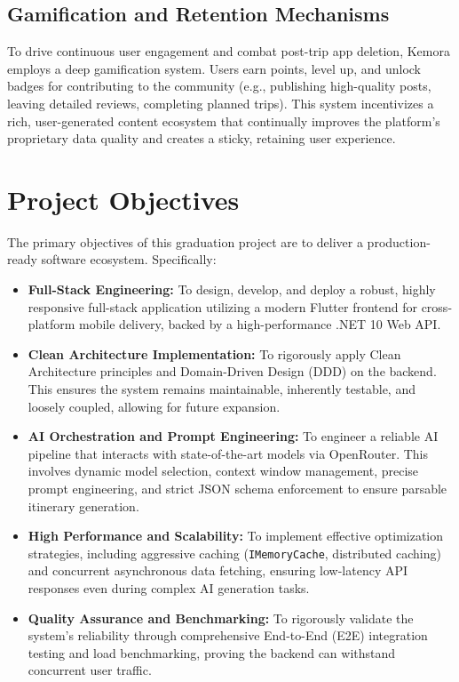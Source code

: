 \subsection{Gamification and Retention Mechanisms}
To drive continuous user engagement and combat post-trip app deletion, Kemora employs a deep gamification system. Users earn points, level up, and unlock badges for contributing to the community (e.g., publishing high-quality posts, leaving detailed reviews, completing planned trips). This system incentivizes a rich, user-generated content ecosystem that continually improves the platform's proprietary data quality and creates a sticky, retaining user experience.

\section{Project Objectives}
The primary objectives of this graduation project are to deliver a production-ready software ecosystem. Specifically:
\begin{itemize}
    \item \textbf{Full-Stack Engineering:} To design, develop, and deploy a robust, highly responsive full-stack application utilizing a modern Flutter frontend for cross-platform mobile delivery, backed by a high-performance .NET 10 Web API.
    \item \textbf{Clean Architecture Implementation:} To rigorously apply Clean Architecture principles and Domain-Driven Design (DDD) on the backend. This ensures the system remains maintainable, inherently testable, and loosely coupled, allowing for future expansion.
    \item \textbf{AI Orchestration and Prompt Engineering:} To engineer a reliable AI pipeline that interacts with state-of-the-art models via OpenRouter. This involves dynamic model selection, context window management, precise prompt engineering, and strict JSON schema enforcement to ensure parsable itinerary generation.
    \item \textbf{High Performance and Scalability:} To implement effective optimization strategies, including aggressive caching (\texttt{IMemoryCache}, distributed caching) and concurrent asynchronous data fetching, ensuring low-latency API responses even during complex AI generation tasks.
    \item \textbf{Quality Assurance and Benchmarking:} To rigorously validate the system's reliability through comprehensive End-to-End (E2E) integration testing and load benchmarking, proving the backend can withstand concurrent user traffic.
\end{itemize}

